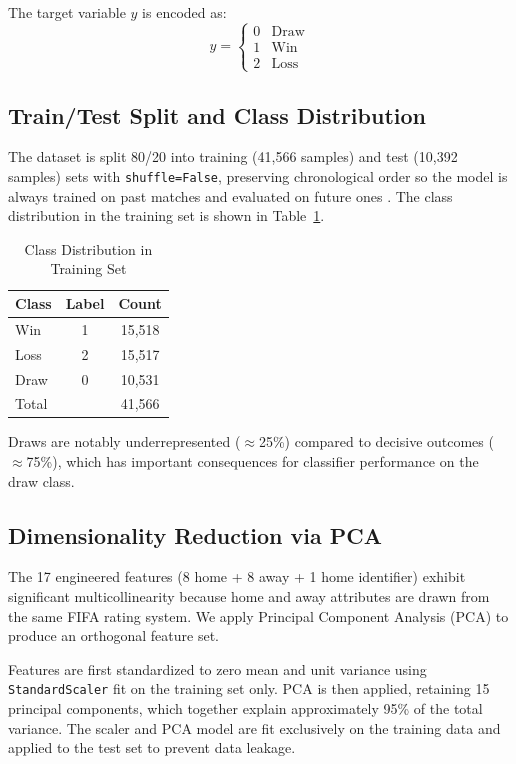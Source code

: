 \documentclass[conference]{IEEEtran}
\begin{document}
The target variable $y$ is encoded as:
\begin{equation}
  y = \begin{cases} 0 & \text{Draw} \\ 1 & \text{Win} \\ 2 & \text{Loss} \end{cases}
\end{equation}

\subsection{Train/Test Split and Class Distribution}

The dataset is split 80/20 into training (41,566 samples) and test (10,392 samples) sets with \texttt{shuffle=False}, preserving chronological order so the model is always trained on past matches and evaluated on future ones \cite{datasplit}. The class distribution in the training set is shown in Table~\ref{tab:class_dist}.

\begin{table}[h]
\caption{Class Distribution in Training Set}
\label{tab:class_dist}
\centering
\begin{tabular}{lcc}
\toprule
\textbf{Class} & \textbf{Label} & \textbf{Count} \\
\midrule
Win  & 1 & 15,518 \\
Loss & 2 & 15,517 \\
Draw & 0 & 10,531 \\
\midrule
Total & & 41,566 \\
\bottomrule
\end{tabular}
\end{table}

Draws are notably underrepresented ($\approx$25\%) compared to decisive outcomes ($\approx$75\%), which has important consequences for classifier performance on the draw class.

\subsection{Dimensionality Reduction via PCA}

The 17 engineered features (8 home + 8 away + 1 home identifier) exhibit significant multicollinearity because home and away attributes are drawn from the same FIFA rating system. We apply Principal Component Analysis (PCA) to produce an orthogonal feature set.

Features are first standardized to zero mean and unit variance using \texttt{StandardScaler} fit on the training set only. PCA is then applied, retaining 15 principal components, which together explain approximately 95\% of the total variance. The scaler and PCA model are fit exclusively on the training data and applied to the test set to prevent data leakage.
\end{document}
